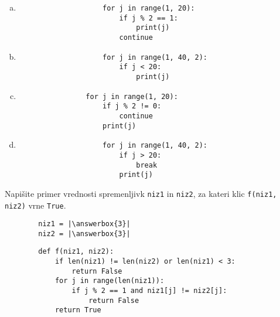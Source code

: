 \documentclass[arhiv, 10pt]{../izpit}
\newcommand{\inlinepy}[1]{\texttt{#1}}
\newcommand{\answerbox}[1]{\framebox{\vphantom{\large M}\hspace{#1cm}}}
\begin{document}
        \begin{multicols}{2}
        \begin{enumerate}[(a)]
\item 
                \begin{verbatim}
                    for j in range(1, 20):
                        if j % 2 == 1:
                            print(j)
                        continue
                \end{verbatim}
            
\item 
                \begin{verbatim}
                    for j in range(1, 40, 2):
                        if j < 20:
                            print(j)
                \end{verbatim}
            
\item 
            \begin{verbatim}
                for j in range(1, 20):
                    if j % 2 != 0:
                        continue
                    print(j)
            \end{verbatim}
        
\item 
                \begin{verbatim}
                    for j in range(1, 40, 2):
                        if j > 20:
                            break
                        print(j)
                \end{verbatim}
            
\end{enumerate}

        \end{multicols}
    
        \naloga*
        \begin{multicols}{2}
        \noindent
        Napišite primer vrednosti spremenljivk \inlinepy{niz1} in \inlinepy{niz2}, za kateri klic \inlinepy{f(niz1, niz2)} vrne \inlinepy{True}.
        \begin{verbatim}
        niz1 = |\answerbox{3}|
        niz2 = |\answerbox{3}|
        \end{verbatim}
        \vfil
        \columnbreak
        \begin{verbatim}
        def f(niz1, niz2):
            if len(niz1) != len(niz2) or len(niz1) < 3:
                return False
            for j in range(len(niz1)):
                if j % 2 == 1 and niz1[j] != niz2[j]:
                    return False
            return True
        \end{verbatim}
        \end{multicols}
    
\end{document}
